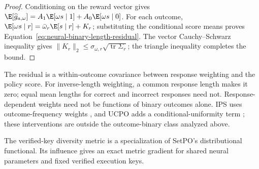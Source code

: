 \begin{proof}
\enforcehalffinalproseline
Conditioning on the reward vector gives
$\E[\widehat g_{a,\omega}]
=A_1\E[\omega s\mid1]+A_0\E[\omega s\mid0]$.
For each outcome, $\E[\omega s\mid r]
=\bar\omega_r\E[s\mid r]+K_r$; substituting the conditional score
means proves Equation~\eqref{eq:neural-binary-length-residual}.
The vector Cauchy--Schwarz inequality gives
$\|K_r\|_2\le\sigma_{\omega,r}\sqrt{\operatorname{tr}\Sigma_r}$;
the triangle inequality completes the bound.
\end{proof}

The residual is a within-outcome covariance between response weighting and
the policy score. For inverse-length weighting, a common response length
makes it zero; equal mean lengths for correct and incorrect responses need
not. Response-dependent weights need not be functions of binary outcomes
alone. IPS uses outcome-frequency weights
\citep[Section~4.4, v1]{sinha2026expected}, and UCPO adds a
conditional-uniformity term \citep[Section~6, v1]{lochab2026ucpo}; these
interventions are outside the outcome-binary class analyzed above.

The verified-key diversity metric is a specialization of SetPO's
distributional functional. Its influence gives an exact metric gradient
for shared neural parameters and fixed verified execution keys.

